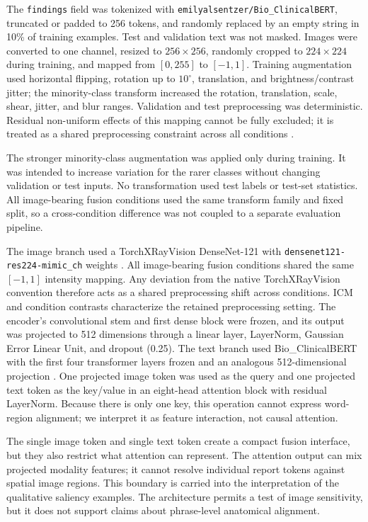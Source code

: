 \documentclass[10pt,a4paper,twocolumn]{article}
\begin{document}
The \texttt{findings} field was tokenized with
\texttt{emilyalsentzer/Bio\_ClinicalBERT}, truncated or padded to 256 tokens,
and randomly replaced by an empty string in 10\% of training examples. Test and
validation text was not masked. Images were converted to one channel, resized
to $256\times256$, randomly cropped to $224\times224$ during training, and
mapped from $[0,255]$ to $[-1,1]$. Training augmentation used horizontal
flipping, rotation up to $10^{\circ}$, translation, and brightness/contrast
jitter; the minority-class transform increased the rotation, translation,
scale, shear, jitter, and blur ranges. Validation and test preprocessing was
deterministic. Residual non-uniform effects of this mapping cannot be fully
excluded; it is treated as a shared preprocessing constraint across all
conditions \cite{cohen2022torchxrayvision}.

The stronger minority-class augmentation was applied only during training. It
was intended to increase variation for the rarer classes without changing
validation or test inputs. No transformation used test labels or test-set
statistics. All image-bearing fusion conditions used the same transform family
and fixed split, so a cross-condition difference was not coupled to a separate
evaluation pipeline.

The image branch used a TorchXRayVision DenseNet-121 with
\texttt{densenet121-res224-mimic\_ch} weights
\cite{huang2017densenet,cohen2022torchxrayvision}. All image-bearing fusion
conditions shared the same $[-1,1]$ intensity mapping. Any deviation from the
native TorchXRayVision convention therefore acts as a shared preprocessing
shift across conditions. ICM and condition contrasts characterize the retained
preprocessing setting.
The encoder's convolutional stem and
first dense block were frozen, and its output was projected to 512 dimensions
through a linear layer, LayerNorm, Gaussian Error Linear Unit, and dropout
(0.25). The text branch used Bio\_ClinicalBERT with the first four transformer
layers frozen and an analogous 512-dimensional projection
\cite{devlin2019bert,alsentzer2019clinicalbert}. One projected image token was
used as the query and one projected text token as the key/value in an eight-head
attention block with residual LayerNorm. Because there is only one key, this
operation cannot express word-region alignment; we interpret it as feature
interaction, not causal attention.

The single image token and single text token create a compact fusion interface,
but they also restrict what attention can represent. The attention output can
mix projected modality features; it cannot resolve individual report tokens
against spatial image regions. This boundary is carried into the interpretation
of the qualitative saliency examples. The architecture permits a test of image
sensitivity, but it does not support claims about phrase-level anatomical
alignment.
\end{document}
